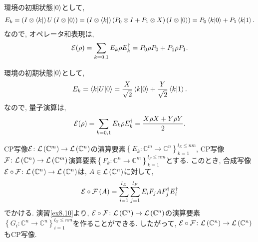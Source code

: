 \begin{ex}
    \label{ex8.4}
    環境の初期状態$\ket{0}$として,
    \begin{align*}
        E_k
        = \left(I \otimes \bra{k}\right)   U  \left(I \otimes \ket{0}\right)
        = 
        \left(I \otimes \bra{k}\right)  
        \left( P_0 \otimes I + P_1 \otimes X  \right)
        \left(I \otimes \ket{0}\right)
        = P_0 \braket{k|0} + P_1 \braket{k|1}.
    \end{align*}
    なので, オペレータ和表現は, 
    \begin{align*}
        \mathcal{E} (\rho)
        = \sum_{k = 0, 1} E_k \rho E_k^\dagger
        = P_0 \rho P_0 + P_1 \rho P_1.
    \end{align*}
\end{ex}

\begin{ex}
    \label{ex8.5}
    環境の初期状態$\ket{0}$として,
    \begin{align*}
        E_k
        = \braket{k | U | 0}
        = \frac{X}{\sqrt{2}} \braket{k|0} + \frac{Y}{\sqrt{2}} \braket{k|1}.
    \end{align*}
    なので, 量子演算は,
    \begin{align*}
        \mathcal{E} (\rho)
        = \sum_{k = 0, 1} E_k \rho E_k^\dagger
        = \frac{X \rho X + Y \rho Y}{2}.
    \end{align*}
\end{ex}

\begin{ex}
    \label{ex8.6}
    \par
    CP写像$\mathcal{E} \colon \mathcal{L}\left({\mathbb{C}^m}\right) \to \mathcal{L}\left({\mathbb{C}^n}\right)$の演算要素$\left\{E_k \colon \mathbb{C}^m \to \mathbb{C}^n \right\}_{k=1}^{l_E \le nm}$, CP写像$\mathcal{F} \colon \mathcal{L}\left({\mathbb{C}^n}\right) \to \mathcal{L}\left({\mathbb{C}^m}\right)$演算要素$\left\{F_k \colon \mathbb{C}^n \to \mathbb{C}^m \right\}_{k=1}^{l_F \le nm}$とする. このとき, 合成写像$\mathcal{E} \circ \mathcal{F} \colon \mathcal{L}\left({\mathbb{C}^n}\right) \to \mathcal{L}\left({\mathbb{C}^n}\right)$は, $A \in \mathcal{L}\left({\mathbb{C}^n}\right)$に対して,
    \begin{align*}
        \mathcal{E} \circ \mathcal{F} \left( A\right)
        =
        \sum_{i = 1}^{l_E}\sum_{j=1}^{l_F}
        E_i F_j A F_j^\dagger E_i^\dagger
    \end{align*}
    でかける. 演習\ref{ex8.10}より, $\mathcal{E} \circ \mathcal{F} \colon \mathcal{L}\left({\mathbb{C}^n}\right) \to \mathcal{L}\left({\mathbb{C}^n}\right)$の演算要素$\left\{G_i \colon \mathbb{C}^n \to \mathbb{C}^n \right\}_{i=1}^{l_G \le nm}$を作ることができる. したがって, $\mathcal{E} \circ \mathcal{F} \colon \mathcal{L}\left({\mathbb{C}^n}\right) \to \mathcal{L}\left({\mathbb{C}^n}\right)$もCP写像.
\end{ex}


